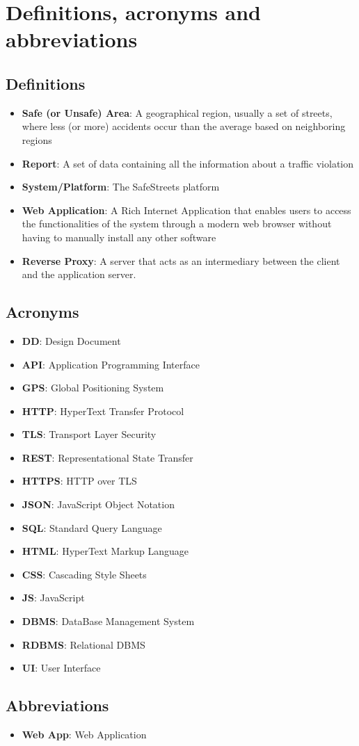 \section{Definitions, acronyms and abbreviations}

\subsection{Definitions}
\begin{itemize}
  \item \textbf{Safe (or Unsafe) Area}: A geographical region, usually a set of streets, where less (or more) accidents occur than the average based on neighboring regions
  \item \textbf{Report}: A set of data containing all the information about a traffic violation
  \item \textbf{System/Platform}: The SafeStreets platform
  \item \textbf{Web Application}: A Rich Internet Application that enables users to access the functionalities of the system through a modern web browser without having to manually install any other software
  \item \textbf{Reverse Proxy}: A server that acts as an intermediary between the client and the application server.
\end{itemize}

\subsection{Acronyms}
\begin{itemize}
  \item \textbf{DD}: Design Document
  \item \textbf{API}: Application Programming Interface
  \item \textbf{GPS}: Global Positioning System
  \item \textbf{HTTP}: HyperText Transfer Protocol
  \item \textbf{TLS}: Transport Layer Security
  \item \textbf{REST}: Representational State Transfer 
  \item \textbf{HTTPS}: HTTP over TLS
  \item \textbf{JSON}: JavaScript Object Notation
  \item \textbf{SQL}: Standard Query Language
  \item \textbf{HTML}: HyperText Markup Language
  \item \textbf{CSS}: Cascading Style Sheets
  \item \textbf{JS}: JavaScript
  \item \textbf{DBMS}: DataBase Management System
  \item \textbf{RDBMS}: Relational DBMS
  \item \textbf{UI}: User Interface
\end{itemize}

\subsection{Abbreviations}
\begin{itemize}
  \item \textbf{Web App}: Web Application
\end{itemize}